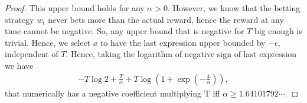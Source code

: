 \begin{proof}
This upper bound holds for any $\alpha>0$. However, we know that the betting strategy $w_t$ never bets more than the actual reward, hence the reward at any time cannot be negative. So, any upper bound that is negative for $T$ big enough is trivial.
Hence, we select $a$ to have the last expression upper bounded by $-\epsilon$, independent of $T$. Hence, taking the logarithm of negative sign of last expression we have
\begin{align}
-T\log 2+ \frac{T}{\alpha} + T \log \left(1+\exp\left(-\frac{4}{\alpha}\right)\right),
\end{align}
that numerically has a negative coefficient multiplying T iff $\alpha\geq1.64101792\cdots$.
\end{proof}